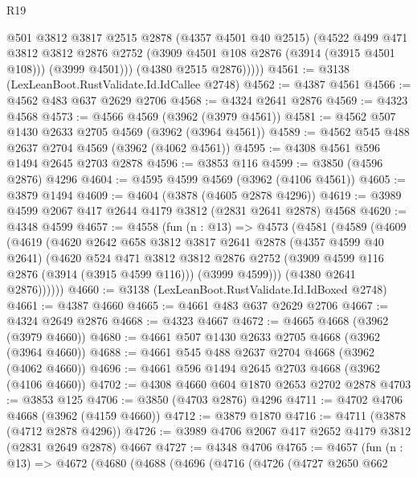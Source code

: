 \begin{lexlean}{R19}
\begin{coremodule}
              @501
              @3812
              @3817
              @2515
              @2878
              (@4357 @4501 @40 @2515)
              (@4522
                @499
                @471
                @3812
                @3812
                @2876
                @2752
                (@3909 @4501 @108 @2876 (@3914 (@3915 @4501 @108)))
                (@3999 @4501)))
            (@4380 @2515 @2876)))))
@4561 := @3138 (LexLeanBoot.RustValidate.Id.IdCallee @2748)
@4562 := @4387 @4561
@4566 := @4562 @483 @637 @2629 @2706
@4568 := @4324 @2641 @2876
@4569 := @4323 @4568
@4573 := @4566 @4569 (@3962 (@3979 @4561))
@4581 := @4562 @507 @1430 @2633 @2705 @4569 (@3962 (@3964 @4561))
@4589 := @4562 @545 @488 @2637 @2704 @4569 (@3962 (@4062 @4561))
@4595 := @4308 @4561 @596 @1494 @2645 @2703 @2878
@4596 := @3853 @116
@4599 := @3850 (@4596 @2876) @4296
@4604 := @4595 @4599 @4569 (@3962 (@4106 @4561))
@4605 := @3879 @1494
@4609 := @4604 (@3878 (@4605 @2878 @4296))
@4619 := @3989 @4599 @2067 @417 @2644 @4179 @3812 (@2831 @2641 @2878) @4568
@4620 := @4348 @4599
@4657 := @4558
    (fun (n : @13) =>
    @4573
      (@4581
        (@4589
          (@4609
            (@4619
              (@4620
                @2642
                @658
                @3812
                @3817
                @2641
                @2878
                (@4357 @4599 @40 @2641)
                (@4620
                  @524
                  @471
                  @3812
                  @3812
                  @2876
                  @2752
                  (@3909 @4599 @116 @2876 (@3914 (@3915 @4599 @116)))
                  (@3999 @4599)))
              (@4380 @2641 @2876))))))
@4660 := @3138 (LexLeanBoot.RustValidate.Id.IdBoxed @2748)
@4661 := @4387 @4660
@4665 := @4661 @483 @637 @2629 @2706
@4667 := @4324 @2649 @2876
@4668 := @4323 @4667
@4672 := @4665 @4668 (@3962 (@3979 @4660))
@4680 := @4661 @507 @1430 @2633 @2705 @4668 (@3962 (@3964 @4660))
@4688 := @4661 @545 @488 @2637 @2704 @4668 (@3962 (@4062 @4660))
@4696 := @4661 @596 @1494 @2645 @2703 @4668 (@3962 (@4106 @4660))
@4702 := @4308 @4660 @604 @1870 @2653 @2702 @2878
@4703 := @3853 @125
@4706 := @3850 (@4703 @2876) @4296
@4711 := @4702 @4706 @4668 (@3962 (@4159 @4660))
@4712 := @3879 @1870
@4716 := @4711 (@3878 (@4712 @2878 @4296))
@4726 := @3989 @4706 @2067 @417 @2652 @4179 @3812 (@2831 @2649 @2878) @4667
@4727 := @4348 @4706
@4765 := @4657
    (fun (n : @13) =>
    @4672
      (@4680
        (@4688
          (@4696
            (@4716
              (@4726
                (@4727
                  @2650
                  @662

\end{coremodule}
\end{lexlean}
